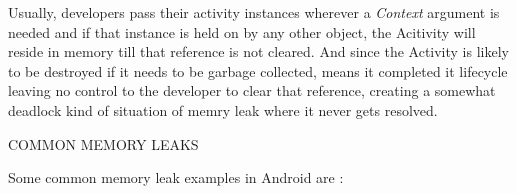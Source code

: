 \documentclass[journal]{IEEEtran}
\begin{document}
Usually, developers pass their activity instances wherever a \emph{Context} argument is needed and if that instance is held on by any other object, the Acitivity will reside in memory till that reference is not cleared. And since the Activity is likely to be destroyed if it needs to be garbage collected, means it completed it lifecycle leaving no control to the developer to clear that reference, creating a somewhat deadlock kind of situation of memry leak where it never gets resolved.\\

\begin{center}
	COMMON MEMORY LEAKS
\end{center}

Some common memory leak examples in Android are :\\
\end{document}
